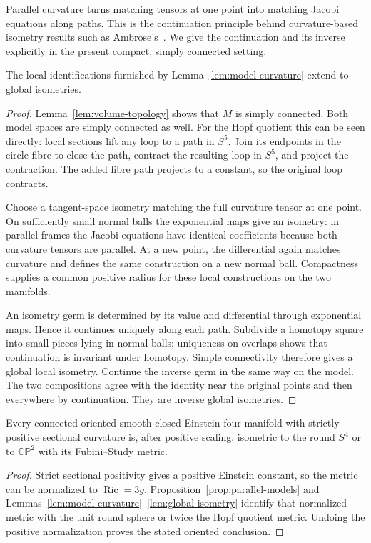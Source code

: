 Parallel curvature turns matching tensors at one point into matching
Jacobi equations along paths. This is the continuation principle behind
curvature-based isometry results such as Ambrose's~\cite{Ambrose1956}.
We give the continuation and its inverse explicitly in the present
compact, simply connected setting.

\begin{lemma}\label{lem:global-isometry}
The local identifications furnished by Lemma~\ref{lem:model-curvature} extend to global isometries.
\end{lemma}
\begin{proof}
Lemma~\ref{lem:volume-topology} shows that $M$ is simply connected. Both model spaces are simply connected as well. For the Hopf quotient this can be seen directly: local sections lift any loop to a path in $S^5$. Join its endpoints in the circle fibre to close the path, contract the resulting loop in $S^5$, and project the contraction. The added fibre path projects to a constant, so the original loop contracts.

Choose a tangent-space isometry matching the full curvature tensor at one point. On sufficiently small normal balls the exponential maps give an isometry: in parallel frames the Jacobi equations have identical coefficients because both curvature tensors are parallel. At a new point, the differential again matches curvature and defines the same construction on a new normal ball. Compactness supplies a common positive radius for these local constructions on the two manifolds.

An isometry germ is determined by its value and differential through exponential maps. Hence it continues uniquely along each path. Subdivide a homotopy square into small pieces lying in normal balls; uniqueness on overlaps shows that continuation is invariant under homotopy. Simple connectivity therefore gives a global local isometry. Continue the inverse germ in the same way on the model. The two compositions agree with the identity near the original points and then everywhere by continuation. They are inverse global isometries.
\end{proof}

\begin{corollary}
\label{cor:oriented-classification}
Every connected oriented smooth closed Einstein four-manifold with
strictly positive sectional curvature is, after positive scaling,
isometric to the round $S^4$ or to $\mathbb{CP}^2$ with its
Fubini--Study metric.
\end{corollary}
\begin{proof}
Strict sectional positivity gives a positive Einstein constant, so the
metric can be normalized to $\operatorname{Ric}=3g$.
Proposition~\ref{prop:parallel-models} and
Lemmas~\ref{lem:model-curvature}--\ref{lem:global-isometry} identify
that normalized metric with the unit round sphere or twice the Hopf
quotient metric. Undoing the positive normalization proves the stated
oriented conclusion.
\end{proof}

